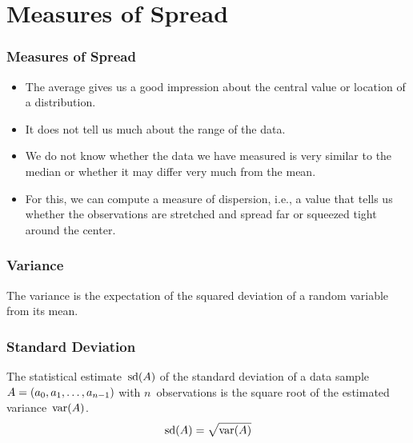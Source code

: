 \documentclass[mathserif]{beamer}%
\begin{document}
\section{Measures of Spread}%
%
\begin{frame}%
\frametitle{Measures of Spread}%
\begin{itemize}%
\item The average gives us a good impression about the central value or location of a distribution.%
\item<2-> It does not tell us much about the range of the data.%
\item<3-> We do not know whether the data we have measured is very similar to the median or whether it may differ very much from the mean.%
\item<4-> For this, we can compute a measure of dispersion, i.e., a value that tells us whether the observations are stretched and spread far or squeezed tight around the center.
\end{itemize}%
\end{frame}%
%
\begin{frame}%
\frametitle{Variance}%
\begin{definition}[Variance]%
The variance is the expectation of the squared deviation of a random variable from its mean.%
%
\end{definition}%
\end{frame}%
%
\begin{frame}%
\frametitle{Standard Deviation}%
\begin{definition}%
The statistical estimate~$\textrm{sd}(A)$ of the standard deviation of a data sample~$A=(a_{0},a_{1}, \ldots, a_{n-1})$ with $n$~observations is the square root of the estimated variance~$\textrm{var}(A)$.
\begin{equation}%
\stddev(A) = \sqrt{\variance(A)}%
\nonumber%
\end{equation}%
%
\end{definition}%
%
\end{frame}%
%
\end{document}
